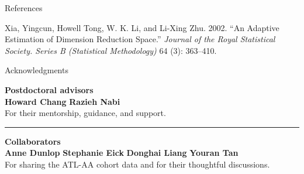 \documentclass[
  ignorenonframetext,
  aspectratio=169,
  11pt]{beamer}
\newlength{\cslhangindent}
\newenvironment{CSLReferences}[2] %
 {\begin{list}{}{%
  \setlength{\itemindent}{0pt}
  \setlength{\leftmargin}{0pt}
  \setlength{\parsep}{0pt}
  \ifodd #1
   \setlength{\leftmargin}{\cslhangindent}
   \setlength{\itemindent}{-1\cslhangindent}
  \fi
  \setlength{\itemsep}{#2\baselineskip}}}
 {\end{list}}
\newcommand{\method}[1]{%
  \textcolor{emoryblue}{\textbf{#1}}%
}
\begin{document}
\begin{frame}[allowframebreaks]{References}
\begin{CSLReferences}{1}{1}
Xia, Yingcun, Howell Tong, W. K. Li, and Li-Xing Zhu. 2002. {``An
{Adaptive Estimation} of {Dimension Reduction Space}.''} \emph{Journal
of the Royal Statistical Society. Series B (Statistical Methodology)} 64
(3): 363--410.

\end{CSLReferences}
\end{frame}

\begin{frame}{Acknowledgments}
\protect{}\label{acknowledgments}
\centering
\large

\method{Postdoctoral advisors}\\[0.16cm]
\textbf{Howard Chang}
\hspace{0.28cm}\raisebox{-0.08cm}{\color{emorygold}\rule{0.8pt}{0.38cm}}\hspace{0.28cm}
\textbf{Razieh Nabi}\\[0.12cm]
\small For their mentorship, guidance, and support.

\vspace{0.36cm}
{\color{rulegray}\rule{0.72\linewidth}{0.6pt}}
\vspace{0.32cm}

\large
\method{Collaborators}\\[0.16cm]
\textbf{Anne Dunlop}
\hspace{0.18cm}\raisebox{-0.08cm}{\color{emorygold}\rule{0.8pt}{0.38cm}}\hspace{0.18cm}
\textbf{Stephanie Eick}
\hspace{0.18cm}\raisebox{-0.08cm}{\color{emorygold}\rule{0.8pt}{0.38cm}}\hspace{0.18cm}
\textbf{Donghai Liang}
\hspace{0.18cm}\raisebox{-0.08cm}{\color{emorygold}\rule{0.8pt}{0.38cm}}\hspace{0.18cm}
\textbf{Youran Tan}\\[0.14cm]
\small For sharing the ATL-AA cohort data and for their thoughtful discussions.
\end{frame}
\end{document}
